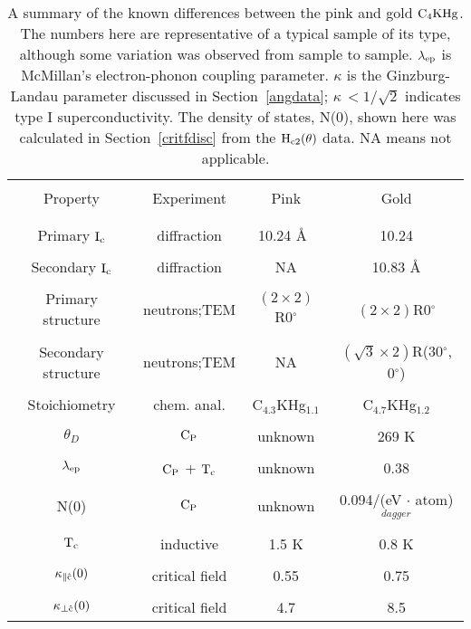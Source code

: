 \begin{table}
\begin{center}
\caption[A summary of the known differences  between the pink and gold $\rm
C_4KHg$]{A summary of the known differences between the  pink and gold $\rm
C_4KHg$.  The numbers here are  representative of  a typical sample  of its
type, although some  variation  was  observed from sample  to sample.  $\rm
\lambda_{ep}$        is      McMillan's     electron-phonon        coupling
parameter.\cite{mcmillan68}  $\kappa$ is   the   Ginzburg-Landau  parameter
discussed in Section~\ref{angdata}; $\kappa
\, < 1/\sqrt{2}$ indicates type I superconductivity. The density of states,
N(0), shown here was calculated in Section~\ref{critfdisc} from the $\rm
H_{c2}(\theta)$ data. NA means not applicable.}
\label{pink-gold}
\begin{tabular}{||c|c|c|c||}
\hline
& & & \\ Property & Experiment & Pink & Gold \\ & & & \\
\hline
& & & \\
Primary $\rm I_c$ &  diffraction\cite{kamitakahara84,lagrange83}& 10.24 \AA\ & 10.24 \\
& & & \\
Secondary $\rm I_c$ & diffraction\cite{kamitakahara84,lagrange83}& NA  &10.83 \AA \\
& & & \\
Primary structure & neutrons\cite{kamitakahara84};TEM\cite{J140} & $(2 \times 2)$R0$^{\circ}$ &  $(2 \times 2)$R0$^{\circ}$  \\
& & & \\
Secondary  structure & neutrons\cite{kamitakahara84};TEM\cite{J140} &NA & $(\sqrt{3} \times 2)$R(30$^{\circ}$, 0$^{\circ}$) \\
& & & \\
Stoichiometry & chem. anal. & C$_{4.3}$KHg$_{1.1}$ & C$_{4.7}$KHg$_{1.2}$ \\
& & & \\
$\theta_D$ & $\rm C_P$\cite{alexander81} & unknown & 269 K\cite{alexander81} \\
& & & \\
$\rm \lambda_{ep}$ & $\rm C_P$\cite{alexander81} + $\rm T_c$ &  unknown & 0.38\cite{iye82} \\
& & & \\
N(0) & $\rm C_P$\cite{alexander81} & unknown & 0.094/(eV $\cdot$ atom)$^{dagger}$\\
& & & \\
$\rm T_c$ & inductive & 1.5 K & 0.8 K \\
& & & \\
$\rm \kappa_{\parallel\hat{c}}(0)$ & critical field  & 0.55 & 0.75 \\
& & & \\
$\rm \kappa_{\perp\hat{c}}(0)$& critical field  & 4.7 & 8.5 \\
\hline
\end{tabular}
\end{center}
\end{table}

